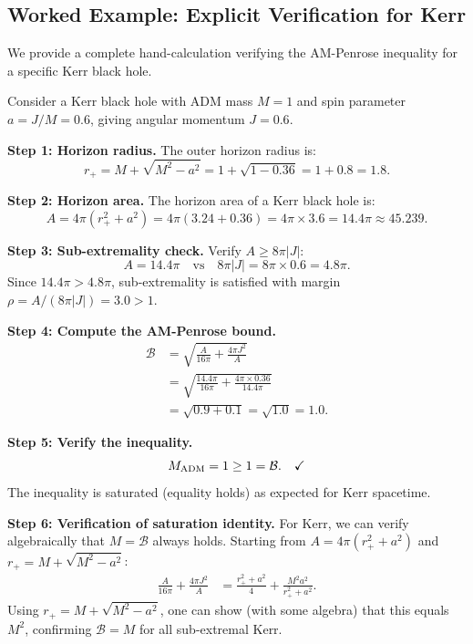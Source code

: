 \subsection{Worked Example: Explicit Verification for Kerr}

We provide a complete hand-calculation verifying the AM-Penrose inequality for a specific Kerr black hole.

\begin{example}[Kerr with $M = 1$, $a = 0.6$]\label{ex:kerr-numeric}
Consider a Kerr black hole with ADM mass $M = 1$ and spin parameter $a = J/M = 0.6$, giving angular momentum $J = 0.6$.

\textbf{Step 1: Horizon radius.}
The outer horizon radius is:
\[
r_+ = M + \sqrt{M^2 - a^2} = 1 + \sqrt{1 - 0.36} = 1 + 0.8 = 1.8.
\]

\textbf{Step 2: Horizon area.}
The horizon area of a Kerr black hole is:
\[
A = 4\pi(r_+^2 + a^2) = 4\pi(3.24 + 0.36) = 4\pi \times 3.6 = 14.4\pi \approx 45.239.
\]

\textbf{Step 3: Sub-extremality check.}
Verify $A \geq 8\pi|J|$:
\[
A = 14.4\pi \quad \text{vs} \quad 8\pi|J| = 8\pi \times 0.6 = 4.8\pi.
\]
Since $14.4\pi > 4.8\pi$, sub-extremality is satisfied with margin $\rho = A/(8\pi|J|) = 3.0 > 1$. \checkmark

\textbf{Step 4: Compute the AM-Penrose bound.}
\begin{align*}
\mathcal{B} &= \sqrt{\frac{A}{16\pi} + \frac{4\pi J^2}{A}} \\
&= \sqrt{\frac{14.4\pi}{16\pi} + \frac{4\pi \times 0.36}{14.4\pi}} \\
&= \sqrt{0.9 + 0.1} = \sqrt{1.0} = 1.0.
\end{align*}

\textbf{Step 5: Verify the inequality.}
\[
M_{\mathrm{ADM}} = 1 \geq 1 = \mathcal{B}. \quad \checkmark
\]
The inequality is saturated (equality holds) as expected for Kerr spacetime.

\textbf{Step 6: Verification of saturation identity.}
For Kerr, we can verify algebraically that $M = \mathcal{B}$ always holds. Starting from $A = 4\pi(r_+^2 + a^2)$ and $r_+ = M + \sqrt{M^2 - a^2}$:
\begin{align*}
\frac{A}{16\pi} + \frac{4\pi J^2}{A} &= \frac{r_+^2 + a^2}{4} + \frac{M^2 a^2}{r_+^2 + a^2}.
\end{align*}
Using $r_+ = M + \sqrt{M^2 - a^2}$, one can show (with some algebra) that this equals $M^2$, confirming $\mathcal{B} = M$ for all sub-extremal Kerr.
\end{example}

